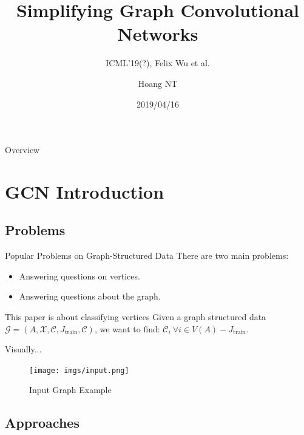 \documentclass{beamer}
\title{Simplifying Graph Convolutional Networks}
\subtitle{ICML'19(?), Felix Wu et al.}
\author{Hoang NT}
\institute{Murata Laboratory \\ Tokyo Tech \vspace{4em}}
\date{2019/04/16}
\begin{document}
    \begin{frame}
        \maketitle
    \end{frame}

    \begin{frame}{Overview}
        \tableofcontents
    \end{frame}

    \section{GCN Introduction}

    \subsection{Problems}

    \begin{frame}{Popular Problems on Graph-Structured Data}
        There are two main problems:
        \pause
        \begin{itemize}
            \item Answering questions on vertices.
            \pause
            \item Answering questions about the graph.
        \end{itemize}
        \pause
        \vspace{1em}
        \begin{block}{This paper is about classifying vertices}
            Given a graph structured data $\mathcal{G} = (A, \mathcal{X}, \mathcal{C}, J_{\text{train}}, \mathcal{C})$,
            we want to find: $\mathcal{C}_i \ \forall i \in V(A) - J_{\text{train}}$.
        \end{block}
    \end{frame}

    \begin{frame}{Visually...}
        \begin{figure}
            \centering
            \texttt{[image: imgs/input.png]}
            \caption{Input Graph Example}
            \label{fig:input}
        \end{figure}
    \end{frame}

    \subsection{Approaches}
\end{document}
